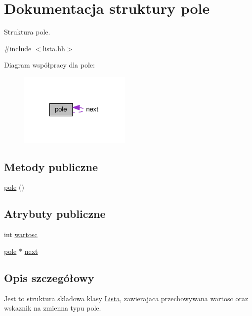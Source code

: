 \hypertarget{structpole}{\section{Dokumentacja struktury pole}
\label{structpole}
}


Struktura pole.  




{\ttfamily \#include $<$lista.\-hh$>$}



Diagram współpracy dla pole\-:\nopagebreak
\begin{figure}[H]
\begin{center}
\leavevmode
\includegraphics[width=154pt]{structpole__coll__graph}
\end{center}
\end{figure}
\subsection*{Metody publiczne}
\begin{DoxyCompactItemize}
\item 
\hyperlink{structpole_a6d02cdb7a21cebb2c0a3c5c9936dd038}{pole} ()
\end{DoxyCompactItemize}
\subsection*{Atrybuty publiczne}
\begin{DoxyCompactItemize}
\item 
int \hyperlink{structpole_a22b23161f03ecb022f751026360b8348}{wartosc}
\item 
\hyperlink{structpole}{pole} $\ast$ \hyperlink{structpole_a323a379be6456423a7d002d2f67a7a23}{next}
\end{DoxyCompactItemize}


\subsection{Opis szczegółowy}
Jest to struktura skladowa klasy \hyperlink{class_lista}{Lista}, zawierajaca przechowywana wartosc oraz wskaznik na zmienna typu pole. 


